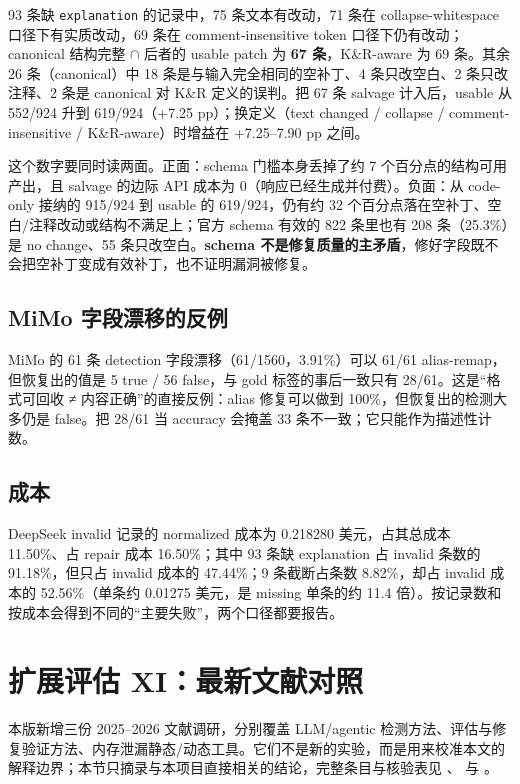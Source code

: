 \documentclass[conference]{IEEEtran}
\begin{document}
93 条缺 \texttt{explanation} 的记录中，75 条文本有改动，71 条在 collapse-whitespace 口径下有实质改动，69 条在 comment-insensitive token 口径下仍有改动；canonical 结构完整 $\cap$ 后者的 usable patch 为 \textbf{67 条}，K\&R-aware 为 69 条。其余 26 条（canonical）中 18 条是与输入完全相同的空补丁、4 条只改空白、2 条只改注释、2 条是 canonical 对 K\&R 定义的误判。把 67 条 salvage 计入后，usable 从 552/924 升到 619/924（+7.25 pp）；换定义（text changed / collapse / comment-insensitive / K\&R-aware）时增益在 +7.25--7.90 pp 之间。

这个数字要同时读两面。正面：schema 门槛本身丢掉了约 7 个百分点的结构可用产出，且 salvage 的边际 API 成本为 0（响应已经生成并付费）。负面：从 code-only 接纳的 915/924 到 usable 的 619/924，仍有约 32 个百分点落在空补丁、空白/注释改动或结构不满足上；官方 schema 有效的 822 条里也有 208 条（25.3\%）是 no change、55 条只改空白。\textbf{schema 不是修复质量的主矛盾}，修好字段既不会把空补丁变成有效补丁，也不证明漏洞被修复。

\subsection{MiMo 字段漂移的反例}

MiMo 的 61 条 detection 字段漂移（61/1560，3.91\%）可以 61/61 alias-remap，但恢复出的值是 5 true / 56 false，与 gold 标签的事后一致只有 28/61。这是“格式可回收 ≠ 内容正确”的直接反例：alias 修复可以做到 100\%，但恢复出的检测大多仍是 false。把 28/61 当 accuracy 会掩盖 33 条不一致；它只能作为描述性计数。

\subsection{成本}

DeepSeek invalid 记录的 normalized 成本为 0.218280 美元，占其总成本 11.50\%、占 repair 成本 16.50\%；其中 93 条缺 explanation 占 invalid 条数的 91.18\%，但只占 invalid 成本的 47.44\%；9 条截断占条数 8.82\%，却占 invalid 成本的 52.56\%（单条约 0.01275 美元，是 missing 单条的约 11.4 倍）。按记录数和按成本会得到不同的“主要失败”，两个口径都要报告。

\section{扩展评估 XI：最新文献对照}
\label{sec:lit-latest}

本版新增三份 2025--2026 文献调研，分别覆盖 LLM/agentic 检测方法、评估与修复验证方法、内存泄漏静态/动态工具。它们不是新的实验，而是用来校准本文的解释边界；本节只摘录与本项目直接相关的结论，完整条目与核验表见 、 与 。
\end{document}
